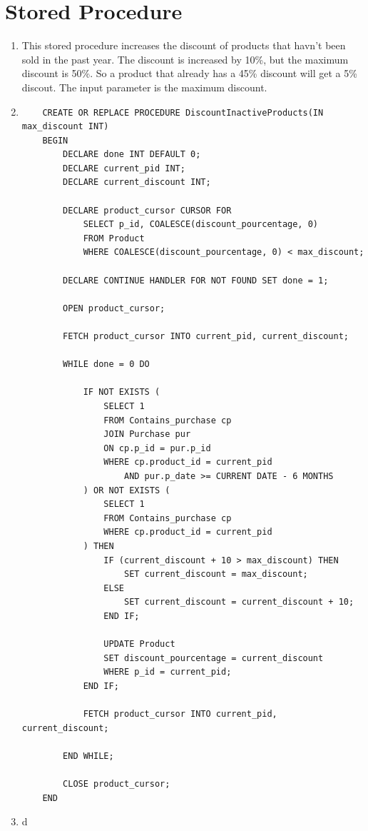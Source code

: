 \documentclass[a4paper,11pt]{article}
\begin{document}
\section*{Stored Procedure}

\begin{enumerate}[label=(\alph*)]
    \item This stored procedure increases the discount of products that havn't been sold in the past year. The discount is increased by 10\%, but the maximum discount is 50\%.
    So a product that already has a 45\% discount will get a 5\% discout. The input parameter is the maximum discount.
    \item
    \begin{lstlisting}
    CREATE OR REPLACE PROCEDURE DiscountInactiveProducts(IN max_discount INT)
    BEGIN
        DECLARE done INT DEFAULT 0;
        DECLARE current_pid INT;
        DECLARE current_discount INT;

        DECLARE product_cursor CURSOR FOR
            SELECT p_id, COALESCE(discount_pourcentage, 0)
            FROM Product
            WHERE COALESCE(discount_pourcentage, 0) < max_discount;

        DECLARE CONTINUE HANDLER FOR NOT FOUND SET done = 1;

        OPEN product_cursor;

        FETCH product_cursor INTO current_pid, current_discount;

        WHILE done = 0 DO

            IF NOT EXISTS (
                SELECT 1
                FROM Contains_purchase cp
                JOIN Purchase pur
                ON cp.p_id = pur.p_id
                WHERE cp.product_id = current_pid
                    AND pur.p_date >= CURRENT DATE - 6 MONTHS
            ) OR NOT EXISTS (
                SELECT 1
                FROM Contains_purchase cp
                WHERE cp.product_id = current_pid
            ) THEN
                IF (current_discount + 10 > max_discount) THEN
                    SET current_discount = max_discount;
                ELSE
                    SET current_discount = current_discount + 10;
                END IF;

                UPDATE Product
                SET discount_pourcentage = current_discount
                WHERE p_id = current_pid;
            END IF;

            FETCH product_cursor INTO current_pid, current_discount;

        END WHILE;

        CLOSE product_cursor;
    END
    \end{lstlisting}

    \item d
\end{enumerate}
\end{document}
